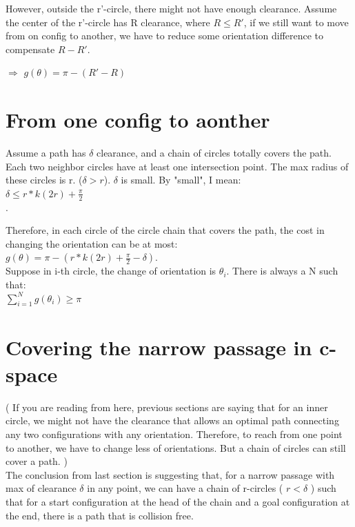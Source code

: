 \documentclass[12pt]{article}
\begin{document}
  However, outside the r'-circle, there might not have enough clearance. Assume the center of the r'-circle has R clearance, where $R \leq R' $, if we still want to move from on config to another, we have to reduce some orientation difference to compensate $R-R'$.

  $\Longrightarrow$ $g(\theta) = \pi - (R'-R)$ \\

  \section{From one config to aonther}

  Assume a path has $\delta$ clearance, and a chain of circles totally covers the path. Each two neighbor circles have at least one intersection point. The max radius of these circles is r. ($\delta > r$). $\delta$ is small. By "small", I mean:\\

  $\delta \leq r*k(2r) + \frac{\pi}{2}$\\.

  Therefore, in each circle of the circle chain that covers the path, the cost in changing the orientation can be at most:\\

  $g(\theta) = \pi - ( r*k(2r) + \frac{\pi}{2} - \delta)$.\\

  Suppose in i-th circle, the change of orientation is $\theta_{i}$. There is always a N such that:\\

  $\sum\limits_{i = 1}^N g(\theta_{i}) \geq \pi$\\

  \section{Covering the narrow passage in c-space}

  ( If you are reading from here, previous sections are saying that for an inner circle, we might not have the clearance that allows an optimal path connecting any two configurations with any orientation. Therefore, to reach from one point to another, we have to change less of orientations. But a chain of circles can still cover a path. )\\

  The conclusion from last section is suggesting that, for a narrow passage with max of clearance $\delta$ in any point, we can have a chain of r-circles ( $r < \delta$ ) such that for a start configuration at the head of the chain and a goal configuration at the end, there is a path that is collision free.\\
\end{document}
